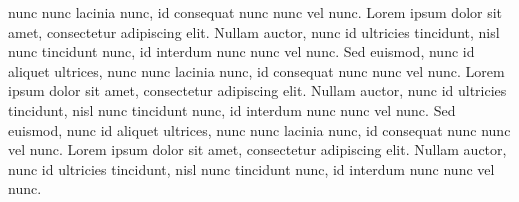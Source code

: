 \documentclass[nodate,openany]{conveyoptions}
\begin{document}
nunc nunc lacinia nunc, id consequat nunc nunc vel nunc. Lorem ipsum dolor sit amet, consectetur adipiscing elit. Nullam auctor, nunc id ultricies tincidunt, nisl nunc tincidunt nunc, id interdum nunc nunc vel nunc. Sed euismod, nunc id aliquet ultrices, nunc nunc lacinia nunc, id consequat nunc nunc vel nunc. Lorem ipsum dolor sit amet, consectetur adipiscing elit. Nullam auctor, nunc id ultricies tincidunt, nisl nunc tincidunt nunc, id interdum nunc nunc vel nunc. Sed euismod, nunc id aliquet ultrices, nunc nunc lacinia nunc, id consequat nunc nunc vel nunc. Lorem ipsum dolor sit amet, consectetur adipiscing elit. Nullam auctor, nunc id ultricies tincidunt, nisl nunc tincidunt nunc, id interdum nunc nunc vel nunc. 
\end{document}
